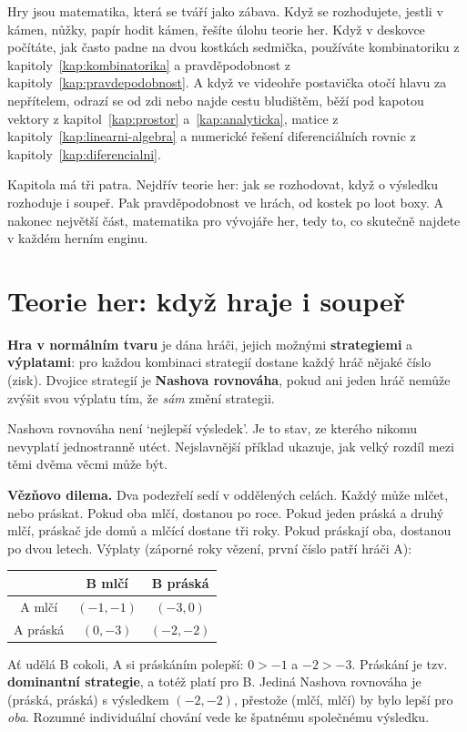 \label{kap:hry}

Hry jsou matematika, která se tváří jako zábava. Když se rozhodujete, jestli v kámen, nůžky, papír hodit kámen, řešíte úlohu teorie her. Když v deskovce počítáte, jak často padne na dvou kostkách sedmička, používáte kombinatoriku z kapitoly~\ref{kap:kombinatorika} a pravděpodobnost z kapitoly~\ref{kap:pravdepodobnost}. A když ve videohře postavička otočí hlavu za nepřítelem, odrazí se od zdi nebo najde cestu bludištěm, běží pod kapotou vektory z kapitol~\ref{kap:prostor} a~\ref{kap:analyticka}, matice z kapitoly~\ref{kap:linearni-algebra} a numerické řešení diferenciálních rovnic z kapitoly~\ref{kap:diferencialni}.

Kapitola má tři patra. Nejdřív teorie her: jak se rozhodovat, když o výsledku rozhoduje i soupeř. Pak pravděpodobnost ve hrách, od kostek po loot boxy. A nakonec největší část, matematika pro vývojáře her, tedy to, co skutečně najdete v každém herním enginu.

\section{Teorie her: když hraje i soupeř}

\begin{definitionbox}
  \textbf{Hra v normálním tvaru} je dána hráči, jejich možnými \textbf{strategiemi} a \textbf{výplatami}: pro každou kombinaci strategií dostane každý hráč nějaké číslo (zisk). Dvojice strategií je \textbf{Nashova rovnováha}, pokud ani jeden hráč nemůže zvýšit svou výplatu tím, že \textit{sám} změní strategii.
\end{definitionbox}

Nashova rovnováha není `nejlepší výsledek'. Je to stav, ze kterého nikomu nevyplatí jednostranně utéct. Nejslavnější příklad ukazuje, jak velký rozdíl mezi těmi dvěma věcmi může být.

\begin{example}
  \textbf{Vězňovo dilema.} Dva podezřelí sedí v oddělených celách. Každý může mlčet, nebo práskat. Pokud oba mlčí, dostanou po roce. Pokud jeden práská a druhý mlčí, práskač jde domů a mlčící dostane tři roky. Pokud práskají oba, dostanou po dvou letech. Výplaty (záporné roky vězení, první číslo patří hráči A):
  \begin{center}
    \begin{tabular}{|c|c|c|}
      \hline
      & B mlčí & B práská\\
      \hline
      A mlčí & $(-1, -1)$ & $(-3, 0)$\\
      \hline
      A práská & $(0, -3)$ & $(-2, -2)$\\
      \hline
    \end{tabular}
  \end{center}
  Ať udělá B cokoli, A si práskáním polepší: $0 > -1$ a $-2 > -3$. Práskání je tzv. \textbf{dominantní strategie}, a totéž platí pro B. Jediná Nashova rovnováha je (práská, práská) s výsledkem $(-2, -2)$, přestože (mlčí, mlčí) by bylo lepší pro \textit{oba}. Rozumné individuální chování vede ke špatnému společnému výsledku.
\end{example}

